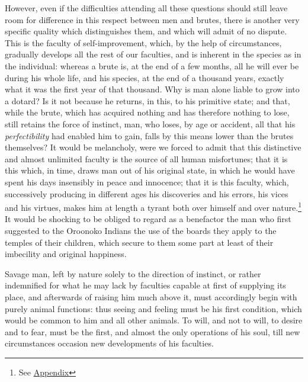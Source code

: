 \documentclass[12pt]{report}
\begin{document}
However, even if the difficulties attending all these questions should still leave room for difference in this respect between men and brutes, there is another very specific quality which distinguishes them, and which will admit of no dispute. This is the faculty of self-improvement, which, by the help of circumstances, gradually develops all the rest of our faculties, and is inherent in the species as in the individual: whereas a brute is, at the end of a few months, all he will ever be during his whole life, and his species, at the end of a thousand years, exactly what it was the first year of that thousand. Why is man alone liable to grow into a dotard? Is it not because he returns, in this, to his primitive state; and that, while the brute, which has acquired nothing and has therefore nothing to lose, still retains the force of instinct, man, who loses, by age or accident, all that his \emph{perfectibility} had enabled him to gain, falls by this means lower than the brutes themselves? It would be melancholy, were we forced to admit that this distinctive and almost unlimited faculty is the source of all human misfortunes; that it is this which, in time, draws man out of his original state, in which he would have spent his days insensibly in peace and innocence; that it is this faculty, which, successively producing in different ages his discoveries and his errors, his vices and his virtues, makes him at length a tyrant both over himself and over nature.\footnote{See \hyperref[appendix]{Appendix}} It would be shocking to be obliged to regard as a benefactor the man who first suggested to the Oroonoko Indians the use of the boards they apply to the temples of their children, which secure to them some part at least of their imbecility and original happiness.

Savage man, left by nature solely to the direction of instinct, or rather indemnified for what he may lack by faculties capable at first of supplying its place, and afterwards of raising him much above it, must accordingly begin with purely animal functions: thus seeing and feeling must be his first condition, which would be common to him and all other animals. To will, and not to will, to desire and to fear, must be the first, and almost the only operations of his soul, till new circumstances occasion new developments of his faculties.
\end{document}
